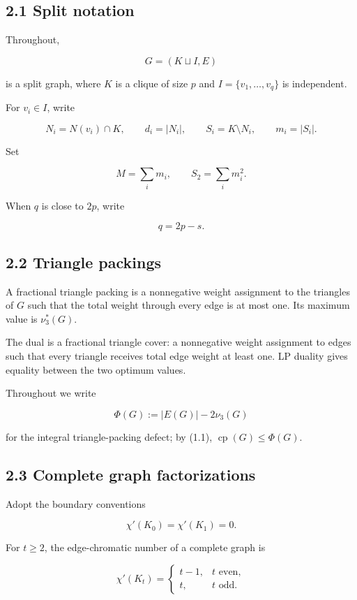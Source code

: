 \documentclass[
  american,
  11pt,
  a4paper,
]{article}
\begin{document}
\subsection{2.1 Split notation}\label{split-notation}

Throughout,

\[
G=(K\sqcup I,E)
\]

is a split graph, where \(K\) is a clique of size \(p\) and \(I=\{v_1,\ldots,v_q\}\) is independent.

For \(v_i\in I\), write

\[
N_i=N(v_i)\cap K,
\qquad
d_i=|N_i|,
\qquad
S_i=K\setminus N_i,
\qquad
m_i=|S_i|.
\]

Set

\[
M=\sum_i m_i,
\qquad
S_2=\sum_i m_i^2.
\]

When \(q\) is close to \(2p\), write

\[
q=2p-s.
\tag{2.1}
\]

\subsection{2.2 Triangle packings}\label{triangle-packings}

A fractional triangle packing is a nonnegative weight assignment to the triangles of \(G\) such that the total weight through every edge is at most one. Its maximum value is \(\nu_3^*(G)\).

The dual is a fractional triangle cover: a nonnegative weight assignment to edges such that every triangle receives total edge weight at least one. LP duality gives equality between the two optimum values.

Throughout we write

\[
\Phi(G):=|E(G)|-2\nu_3(G)
\]

for the integral triangle-packing defect; by (1.1), \(\operatorname{cp}(G)\le\Phi(G)\).

\subsection{2.3 Complete graph factorizations}\label{complete-graph-factorizations}

Adopt the boundary conventions

\[
\chi'(K_0)=\chi'(K_1)=0.
\]

For \(t\ge2\), the edge-chromatic number of a complete graph is

\[
\chi'(K_t)
=
\begin{cases}
t-1,&t\text{ even},\\
t,&t\text{ odd}.
\end{cases}
\tag{2.2}
\]
\end{document}
